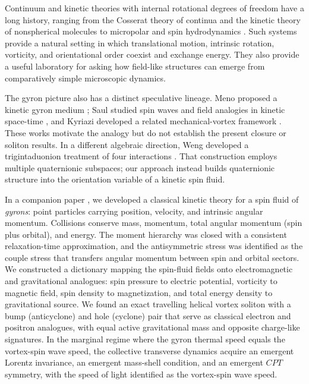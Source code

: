 \documentclass[11pt]{article}
\numberwithin{equation}{section}
\begin{document}
	Continuum and kinetic theories with internal rotational degrees of
	freedom have a long history, ranging from the Cosserat theory of
	continua \cite{cosserat1909} and the kinetic theory of nonspherical
	molecules \cite{curtiss1956} to micropolar \cite{eringen1966} and
	spin hydrodynamics \cite{florkowski2018}. Such systems provide a
	natural setting in which translational motion, intrinsic rotation,
	vorticity, and orientational order coexist and exchange energy. They
	also provide a useful laboratory for asking how field-like structures
	can emerge from comparatively simple microscopic dynamics.
	
The gyron picture also has a distinct speculative lineage. Meno
proposed a kinetic gyron medium \cite{meno1991,meno2000}; Saul
studied spin waves and field analogies in kinetic space-time
\cite{saul2003,saul2015}, and Kyriazi developed a related
mechanical-vortex framework \cite{kyriazi2013}. These works motivate
the analogy but do not establish the present closure or soliton
results. In a different algebraic direction, Weng developed a
trigintaduonion treatment of four interactions \cite{weng2025}.
That construction employs multiple quaternionic subspaces; our
approach instead builds quaternionic structure into the orientation
variable of a kinetic spin fluid.

In a companion paper \cite{gyron}, we developed a classical kinetic
	theory for a spin fluid of \emph{gyrons}: point particles carrying
	position, velocity, and intrinsic angular momentum. Collisions
	conserve mass, momentum, total angular momentum (spin plus orbital),
	and energy. The moment hierarchy was closed with a consistent
	relaxation-time approximation, and the antisymmetric stress was
	identified as the couple stress that transfers angular momentum
	between spin and orbital sectors. We constructed a dictionary
	mapping the spin-fluid fields onto electromagnetic and gravitational
	analogues: spin pressure to electric potential, vorticity to
	magnetic field, spin density to magnetization, and total energy
	density to gravitational source. We found an exact travelling
	helical vortex soliton with a bump (anticyclone) and hole (cyclone)
	pair that serve as classical electron and positron analogues, with
	equal active gravitational mass and opposite charge-like signatures.
	In the marginal regime where the gyron thermal speed equals the
	vortex-spin wave speed, the collective transverse dynamics acquire
	an emergent Lorentz invariance, an emergent mass-shell condition,
	and an emergent $CPT$ symmetry, with the speed of light identified
	as the vortex-spin wave speed.
	
\end{document}
